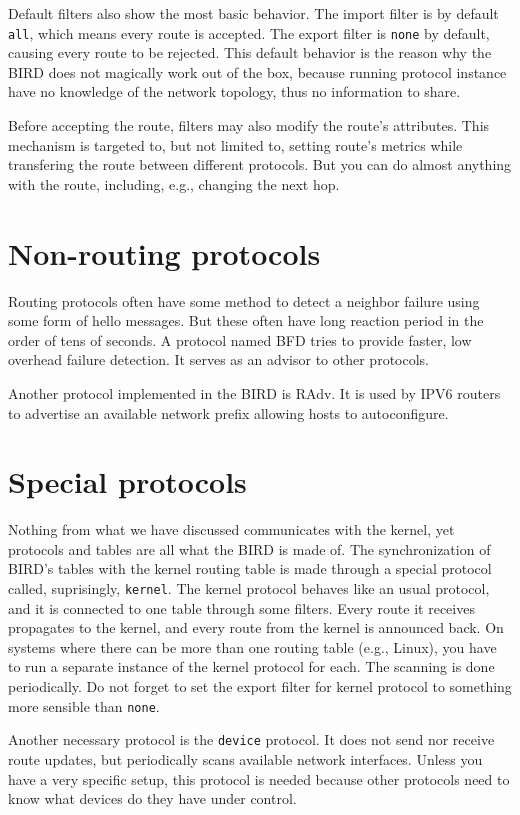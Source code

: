 Default filters also show the most basic behavior. The import filter is by default
\texttt{all}, which means every route is accepted. The export filter is
\texttt{none} by default, causing every route to be rejected. This default
behavior is the reason why the BIRD does not magically work out of the box,
because running protocol instance have no knowledge of the network topology,
thus no information to share.

Before accepting the route, filters may also modify the route's attributes.
This mechanism is targeted to, but not limited to, setting route's metrics
while transfering the route between different protocols. But you can do almost
anything with the route, including, e.g., changing the next hop.

\section{Non-routing protocols}
Routing protocols often have some method to detect a neighbor failure using
some form of hello messages. But these often have long reaction period in the
order of tens of seconds. A protocol named BFD tries to provide faster, low
overhead failure detection. It serves as an advisor to other protocols.

Another protocol implemented in the BIRD is RAdv. It is used by IPV6 routers to
advertise an available network prefix allowing hosts to autoconfigure.

\section{Special protocols}
Nothing from what we have discussed communicates with the kernel, yet protocols
and tables are all what the BIRD is made of. The synchronization of BIRD's
tables with the kernel routing table is made through a special protocol
called, suprisingly, \texttt{kernel}. The kernel protocol behaves like an usual
protocol, and it is connected to one table through some filters. Every route it
receives propagates to the kernel, and every route from the kernel is announced
back. On systems where there can be more than one routing table (e.g., Linux),
you have to run a separate instance of the kernel protocol for each. The
scanning is done periodically. Do not forget to set the export filter for
kernel protocol to something more sensible than \texttt{none}.

Another necessary protocol is the \texttt{device} protocol. It does not send
nor receive route updates, but periodically scans available network interfaces.
Unless you have a very specific setup, this protocol is needed because other
protocols need to know what devices do they have under control.

